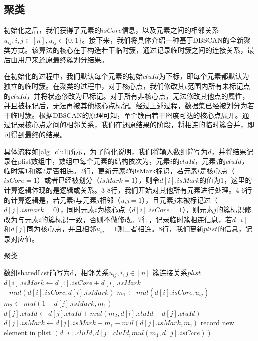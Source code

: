\subsection{聚类}
初始化之后，我们获得了元素的$ isCore $信息，以及元素之间的相邻关系$ u_{ij},i,j\in[n],u_{ij}\in\{0,1\} $。接下来，我们将具体介绍一种基于DBSCAN的全新聚类方式。该算法的核心在于构造若干临时簇，通过记录临时簇之间的连接关系，最后由用户来还原最终簇划分结果。

在初始化的过程中，我们默认每个元素的初始$ cluId $为下标，即每个元素都默认为独立的临时簇。在聚类的过程中，对于核心点，我们修改其$ \epsilon $范围内所有未标记点的$ cluId $，并将状态修改为已标记。对于所有非核心点，无法修改其他点的属性，并且被标记后，无法再被其他核心点标记。经过上述过程，数据集已经被划分为若干临时簇。根据DBSCAN的原理可知，单个簇由若干密度可达的核心点展开。通过记录核心点之间的相邻关系，我们在还原结果的阶段，将相连的临时簇合并，即可得到最终的结果。

具体流程如\ref{alg_clu1}所示，为了简化说明，我们将输入数组简写为$ d $，并将结果记录在plist数组中，数组中每个元素的结构依次为，元素$ i $的$ cluId $，元素$ j $的$ cluId $，临时簇1和簇2是否相连。2行，更新元素$i$的isMark标识，若元素$i$是核心点（$isCore=1$）或者已经被划分（$isMark=1$），则令$ d[i].isMark $的值为$ 1 $，这里的计算逻辑体现的是逻辑或关系。3-8行，我们开始对其他所有元素进行处理。4-6行的计算逻辑是，若元素$ i $与元素$ j $相邻（$ u_ij = 1 $），且元素$ j $未被标记过（$ d[j].ismark=0 $），同时元素$ i $为核心点（$ d[i].isCore =1 $），则元素$ j $的簇标识修改为与元素$ i $的簇标识一致，否则不做修改。7行，记录临时簇相连信息，若$ d[i] $和$ d[j] $同为核心点，并且相邻$ u_{ij}=1 $则二者相连。8行，我们更新$ plist $的信息，记录对应值。

\begin{algorithm}[htbp]
	\renewcommand{\algorithmicrequire}{\textbf{输入:}}
	\renewcommand{\algorithmicensure}{\textbf{输出:}}
	\caption{聚类}
	\label{alg_clu1}
	\begin{algorithmic}[1]
		\REQUIRE 数组sharedList简写为d，相邻关系$ u_{ij},i,j\in[n] $
		\ENSURE 簇连接关系$ plist $
		\STATE $d[i].isMark\leftarrow d[i].isCore+d[i].isMark$\\ $-mul(d[i].isCore,d[i].isMark)$
		\STATE $ m_1 \leftarrow mul(d[i].isCore, u_{ij}) $
		\STATE $ m_2 \leftarrow mul(1-d[j].isMark, m_1) $
		\STATE $ d[j].cluId \leftarrow d[j].cluId + mul(m_2, d[i].cluId - d[j].cluId)$
		\STATE $ d[j].isMark \leftarrow d[j].isMark+m_1 - mul(d[j].isMark, m_1) $
		\STATE record new element in plist $ (d[i].cluId, d[j].cluId, mul(m_1, d[j].isCore)) $
		\ENDFOR
		\ENDFOR
	\end{algorithmic}
\end{algorithm}

